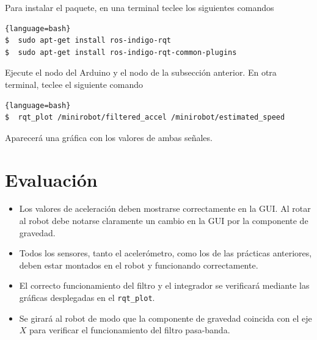 \documentclass[a4paper,12pt]{article}
\begin{document}
Para instalar el paquete, en una terminal teclee los siguientes comandos
\begin{lstlisting}{language=bash}
$  sudo apt-get install ros-indigo-rqt
$  sudo apt-get install ros-indigo-rqt-common-plugins
\end{lstlisting}

Ejecute el nodo del Arduino y el nodo de la subsección anterior. En otra terminal, teclee el siguiente comando
\begin{lstlisting}{language=bash}
$  rqt_plot /minirobot/filtered_accel /minirobot/estimated_speed
\end{lstlisting}
Aparecerá una gráfica con los valores de ambas señales.

\section{Evaluación}
\begin{itemize}
\item Los valores de aceleración deben mostrarse correctamente en la GUI. Al rotar al robot debe notarse claramente un cambio en la GUI por la componente de gravedad.
\item Todos los sensores, tanto el acelerómetro, como los de las prácticas anteriores, deben estar montados en el robot y funcionando correctamente. 
\item El correcto funcionamiento del filtro y el integrador se verificará mediante las gráficas desplegadas en el \texttt{rqt\_plot}.
\item Se girará al robot de modo que la componente de gravedad coincida con el eje $X$ para verificar el funcionamiento del filtro pasa-banda. 
\end{itemize}
\end{document}
